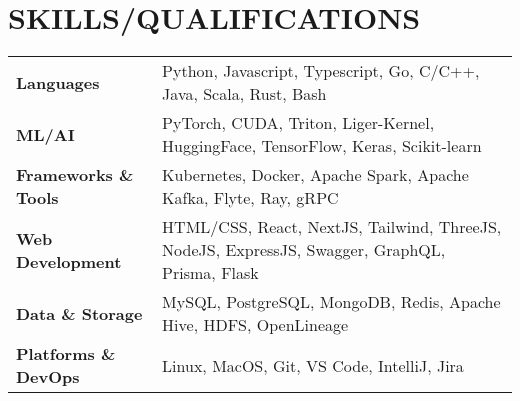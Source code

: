 \section{SKILLS/QUALIFICATIONS}

\small{
  \begin{tabularx}{\linewidth}{@{} p{3.5cm} X @{}}
    \textbf{Languages} & Python, Javascript, Typescript, Go, C/C++, Java, Scala, Rust, Bash \\
    \textbf{ML/AI} & PyTorch, CUDA, Triton, Liger-Kernel, HuggingFace, TensorFlow, Keras, Scikit-learn \\
    \textbf{Frameworks \& Tools} & Kubernetes, Docker, Apache Spark, Apache Kafka, Flyte, Ray, gRPC \\
    \textbf{Web Development} & HTML/CSS, React, NextJS, Tailwind, ThreeJS, NodeJS, ExpressJS, Swagger, GraphQL, Prisma, Flask \\
    \textbf{Data \& Storage} & MySQL, PostgreSQL, MongoDB, Redis, Apache Hive, HDFS, OpenLineage \\
    \textbf{Platforms \& DevOps} & Linux, MacOS, Git, VS Code, IntelliJ, Jira
  \end{tabularx}
}